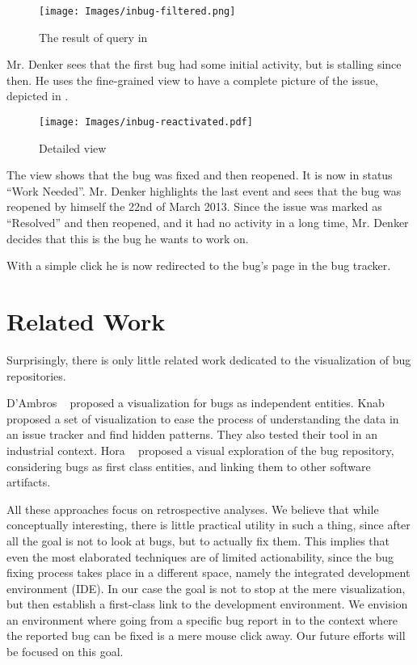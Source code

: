 \begin{figure}[ht]
\center
\texttt{[image: Images/inbug-filtered.png]}
\caption{The result of query in }
\label{fig-inbug-filtered}
\end{figure}

Mr. Denker sees that the first bug had some initial activity, but is stalling since then. He uses the fine-grained view to have a complete picture of the issue, depicted in .

\begin{figure}[ht]
\center
\texttt{[image: Images/inbug-reactivated.pdf]}
\caption{Detailed view}
\label{fig-inbug-reactivated}
\end{figure}

The view shows that the bug was fixed and then reopened. It is now in status ``Work Needed''. Mr. Denker highlights the last event and sees that the bug was reopened by himself the 22nd of March 2013. Since the issue was marked as ``Resolved'' and then reopened, and it had no activity in a long time, Mr. Denker decides that this is the bug he wants to work on.

With a simple click he is now redirected to the bug's page in the bug tracker.



\section{Related Work}

Surprisingly, there is only little related work dedicated to the visualization of bug repositories.

D'Ambros \etal~\cite{DAmb2007b} proposed a visualization for bugs as independent entities. Knab \etal~\cite{Knab2009a,Knab2010a} proposed a set of visualization to ease the process of understanding the data in an issue tracker and find hidden patterns. They also tested their tool in an industrial context. Hora \etal~\cite{Hora2012a} proposed a visual exploration of the bug repository, considering bugs as first class entities, and linking them to other software artifacts.

All these approaches focus on retrospective analyses. We believe that while conceptually interesting, there is little practical utility in such a thing, since after all the goal is not to look at bugs, but to actually fix them. This implies that even the most elaborated techniques are of limited actionability, since the bug fixing process takes place in a different space, namely the integrated development environment (IDE). In our case the goal is not to stop at the mere visualization, but then establish a first-class link to the development environment. We envision an environment where going from a specific bug report in \ib to the context where the reported bug can be fixed is a mere mouse click away. Our future efforts will be focused on this goal.



